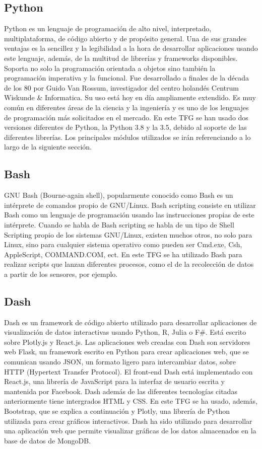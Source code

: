 \documentclass[a4paper, 12pt, oneside]{book}
\begin{document}
\subsection{Python}
\label{subsec:python}
Python es un lenguaje de programación de alto nivel, interpretado, multiplataforma, de código abierto y de propósito general. Una de sus grandes ventajas es la sencillez y la legibilidad a la hora de desarrollar aplicaciones usando este lenguaje, además, de la multitud de librerías y frameworks disponibles. Soporta no solo la programación orientada a objetos sino también la programación imperativa y la funcional.
Fue desarrollado a finales de la década de los 80 por Guido Van Rossum, investigador del centro holandés Centrum Wiskunde \& Informatica.
Su uso está hoy en día ampliamente extendido. Es muy común en diferentes áreas de la ciencia y la ingeniería y es uno de los lenguajes de programación más solicitados en el mercado.
En este TFG se han usado dos versiones diferentes de Python, la Python 3.8 y la 3.5, debido al soporte de las diferentes librerías.
Los principales módulos utilizados se irán referenciando a lo largo de la siguiente sección.

\subsection{Bash}
\label{subsec:bash}
GNU Bash (Bourne-again shell), popularmente conocido como Bash es un intérprete de comandos propio de GNU/Linux.
Bash scripting consiste en utilizar Bash como un lenguaje de programación usando las instrucciones propias de este intérprete. Cuando se habla de Bash scripting se habla de un tipo de Shell Scripting propio de los sistemas GNU/Linux, existen muchos otros, no solo para Linux, sino para cualquier sistema operativo como pueden ser Cmd.exe, Csh, AppleScript, COMMAND.COM, ect. En este TFG se ha utilizado Bash para realizar scripts que lanzan diferentes procesos, como el de la recolección de datos a partir de los sensores, por ejemplo.

\subsection{Dash}
\label{subsec:dash}

Dash es un framework de código abierto utilizado para desarrollar aplicaciones de visualización de datos interactivas usando Python, R, Julia o F\#. Está escrito sobre Plotly.js y React.js. Las aplicaciones web creadas con Dash son servidores web Flask, un framework escrito en Python para crear aplicaciones web, que se comunican usando JSON, un formato ligero para intercambiar datos, sobre HTTP (Hypertext Transfer Protocol).
El front-end Dash está implementado con React.js, una librería de JavaScript para la interfaz de usuario escrita y mantenida por Facebook. Dash además de las diferentes tecnologías citadas anteriormente tiene intergrados HTML y CSS. En este TFG se ha usado, además, Bootstrap, que se explica a continuación y Plotly, una librería de Python utilizada para crear gráficos interactivos. Dash ha sido utilizado para desarrollar una aplicación web que permite visualizar gráficas de los datos almacenados en la base de datos de MongoDB.
\end{document}

